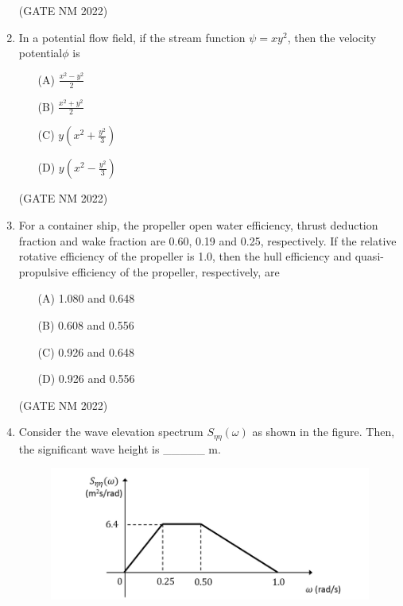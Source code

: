 \documentclass[journal,12pt,onecolumn]{IEEEtran}
\theoremstyle{remark}
\begin{document}
\begin{enumerate}
\hfill(GATE NM 2022)










\item  In a potential flow field, if the stream function $\psi = x y^2$, then the velocity potential$\phi$ is

\begin{enumerate}
	\item[(A)] $\frac{x^2 - y^2}{2} $
	\item[(B)] $\frac{x^2 + y^2}{2} $
	\item[(C)] $y(x^2 + \frac{y^2}{3}) $
	\item[(D)] $y(x^2 - \frac{y^2}{3}) $
\end{enumerate}

\hfill(GATE NM 2022)










\item  For a container ship, the propeller open water efficiency, thrust deduction fraction and wake fraction are 0.60, 0.19 and 0.25, respectively.  
If the relative rotative efficiency of the propeller is 1.0, then the hull efficiency and quasi-propulsive efficiency of the propeller, respectively, are

\begin{enumerate}
    \item[(A)] 1.080 and 0.648
    \item[(B)] 0.608 and 0.556
    \item[(C)] 0.926 and 0.648
    \item[(D)] 0.926 and 0.556
\end{enumerate}

\hfill(GATE NM 2022)









\item  Consider the wave elevation spectrum $S_{\eta\eta}(\omega)$ as shown in the figure.  
Then, the significant wave height is \_\_\_\_\_ m.

\begin{figure}[h]
    \centering
	\includegraphics[width=0.6\columnwidth]{fig5}
	\caption{}
	\label{fig:placeholder}
\end{figure}


\end{enumerate}
\end{document}
